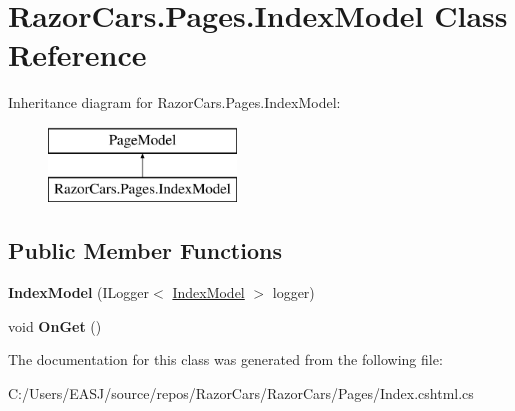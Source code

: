 \hypertarget{class_razor_cars_1_1_pages_1_1_index_model}{}\section{Razor\+Cars.\+Pages.\+Index\+Model Class Reference}
\label{class_razor_cars_1_1_pages_1_1_index_model}
Inheritance diagram for Razor\+Cars.\+Pages.\+Index\+Model\+:\begin{figure}[H]
\begin{center}
\leavevmode
\includegraphics[height=2.000000cm]{class_razor_cars_1_1_pages_1_1_index_model}
\end{center}
\end{figure}
\subsection*{Public Member Functions}
\begin{DoxyCompactItemize}
\item 
\mbox{\label{class_razor_cars_1_1_pages_1_1_index_model_a12f19038f67cb31ce5c942d78932d28e}} 
{\bfseries Index\+Model} (I\+Logger$<$ \mbox{\hyperlink{class_razor_cars_1_1_pages_1_1_index_model}{Index\+Model}} $>$ logger)
\item 
\mbox{\label{class_razor_cars_1_1_pages_1_1_index_model_a54d21729bd252a74dc6923a417fa8755}} 
void {\bfseries On\+Get} ()
\end{DoxyCompactItemize}


The documentation for this class was generated from the following file\+:\begin{DoxyCompactItemize}
\item 
C\+:/\+Users/\+E\+A\+S\+J/source/repos/\+Razor\+Cars/\+Razor\+Cars/\+Pages/Index.\+cshtml.\+cs\end{DoxyCompactItemize}
